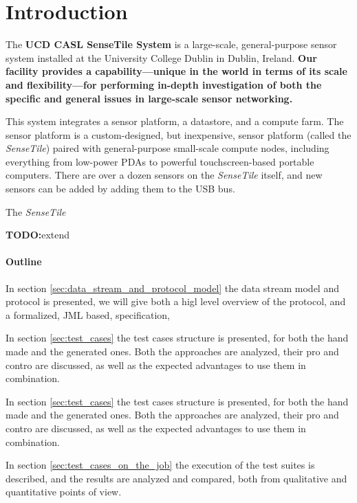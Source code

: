 \documentclass{article}
\newcommand{\todo}{\textbf{TODO:}}
\newcommand{\ST}{\emph{SenseTile}\xspace}
\begin{document}
\begin{abstract}
\end{abstract}

\section{Introduction}

The \textbf{UCD CASL SenseTile System} is a large-scale, general-purpose
sensor system installed at the University College Dublin in Dublin,
Ireland.  \textbf{Our facility provides a capability---unique in the world in
terms of its scale and flexibility---for performing in-depth
investigation of both the specific and general issues in large-scale
sensor networking.}

This system integrates a sensor platform, a datastore, and a compute
farm.  The sensor platform is a custom-designed, but inexpensive,
sensor platform (called the \ST) paired with general-purpose
small-scale compute nodes, including everything from low-power PDAs to
powerful touchscreen-based portable computers.  There are over a dozen
sensors on the \ST itself, and new sensors can be added by adding them
to the USB bus.

The \ST

\todo extend

\paragraph*{Outline}

In section \ref{sec:data_stream_and_protocol_model} the data stream model 
and protocol is presented, we will give both a higl level overview of the 
protocol, and a formalized, JML based, specification,

In section \ref{sec:test_cases} the test cases structure is presented, for 
both the hand made and the generated ones. 
Both the approaches are analyzed, their pro and contro are discussed, as 
well as the expected advantages to use them in combination.

In section \ref{sec:test_cases} the test cases structure is presented, for 
both the hand made and the generated ones. 
Both the approaches are analyzed, their pro and contro are discussed, as 
well as the expected advantages to use them in combination.

In section \ref{sec:test_cases_on_the_job} the execution of the test suites
is described, and the results are analyzed and compared, both from qualitative
and quantitative points of view.
\end{document}
